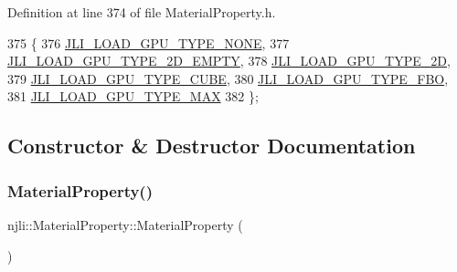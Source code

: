 Definition at line 374 of file Material\+Property.\+h.


\begin{DoxyCode}
375     \{
376       \mbox{\hyperlink{classnjli_1_1_material_property_ae02b26fdb8ff7968cc6def931e69855bab2312f8edb2846647ff841d4a7813c89}{JLI\_LOAD\_GPU\_TYPE\_NONE}},
377       \mbox{\hyperlink{classnjli_1_1_material_property_ae02b26fdb8ff7968cc6def931e69855ba19facd571e661394fd10c4adc26e2de6}{JLI\_LOAD\_GPU\_TYPE\_2D\_EMPTY}},
378       \mbox{\hyperlink{classnjli_1_1_material_property_ae02b26fdb8ff7968cc6def931e69855ba84cee2de1a9c1bff7902327c2871a4cf}{JLI\_LOAD\_GPU\_TYPE\_2D}},
379       \mbox{\hyperlink{classnjli_1_1_material_property_ae02b26fdb8ff7968cc6def931e69855ba705566d6faa4dc00bf60956035329286}{JLI\_LOAD\_GPU\_TYPE\_CUBE}},
380       \mbox{\hyperlink{classnjli_1_1_material_property_ae02b26fdb8ff7968cc6def931e69855bac5507e15f557a30a23a193db80d35b57}{JLI\_LOAD\_GPU\_TYPE\_FBO}},
381       \mbox{\hyperlink{classnjli_1_1_material_property_ae02b26fdb8ff7968cc6def931e69855bab57e4f81335fbb5b1af57ef0dde78a59}{JLI\_LOAD\_GPU\_TYPE\_MAX}}
382     \};
\end{DoxyCode}


\subsection{Constructor \& Destructor Documentation}
\mbox{\label{classnjli_1_1_material_property_a6811e536c0304699a61cfc1024f2ba8f}} 
\subsubsection{\texorpdfstring{Material\+Property()}{MaterialProperty()}\hspace{0.1cm}{\footnotesize\ttfamily [1/3]}}
{\footnotesize\ttfamily njli\+::\+Material\+Property\+::\+Material\+Property (\begin{DoxyParamCaption}{ }\end{DoxyParamCaption})\hspace{0.3cm}{\ttfamily [protected]}}

\mbox{\label{classnjli_1_1_material_property_adb5e4547cc2288c3a2eb3ff527550b7e}} 
